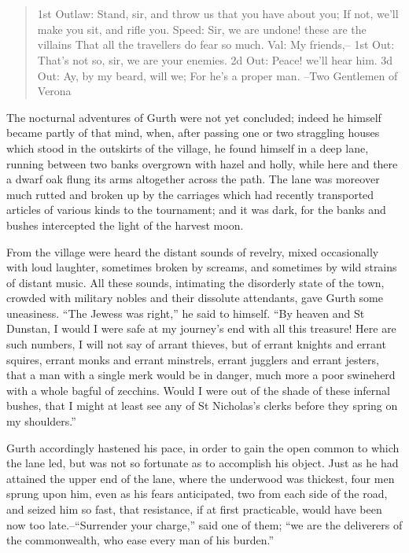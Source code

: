 \chapter{}

\begin{quote}
1st Outlaw: Stand, sir, and throw us that you have about you;
If not, we'll make you sit, and rifle you.
Speed: Sir, we are undone! these are the villains
That all the travellers do fear so much.
Val: My friends,--
1st Out: That's not so, sir, we are your enemies.
2d Out: Peace! we'll hear him.
3d Out: Ay, by my beard, will we;
For he's a proper man.
--Two Gentlemen of Verona
\end{quote}

The nocturnal adventures of Gurth were not yet concluded; indeed he
himself became partly of that mind, when, after passing one or two
straggling houses which stood in the outskirts of the village, he found
himself in a deep lane, running between two banks overgrown with hazel
and holly, while here and there a dwarf oak flung its arms altogether
across the path. The lane was moreover much rutted and broken up by the
carriages which had recently transported articles of various kinds to
the tournament; and it was dark, for the banks and bushes intercepted
the light of the harvest moon.

From the village were heard the distant sounds of revelry, mixed
occasionally with loud laughter, sometimes broken by screams, and
sometimes by wild strains of distant music. All these sounds, intimating
the disorderly state of the town, crowded with military nobles and their
dissolute attendants, gave Gurth some uneasiness. ``The Jewess was
right,'' he said to himself. ``By heaven and St Dunstan, I would I were
safe at my journey's end with all this treasure! Here are such numbers,
I will not say of arrant thieves, but of errant knights and errant
squires, errant monks and errant minstrels, errant jugglers and errant
jesters, that a man with a single merk would be in danger, much more a
poor swineherd with a whole bagful of zecchins. Would I were out of the
shade of these infernal bushes, that I might at least see any of St
Nicholas's clerks before they spring on my shoulders.''

Gurth accordingly hastened his pace, in order to gain the open common to
which the lane led, but was not so fortunate as to accomplish his
object. Just as he had attained the upper end of the lane, where the
underwood was thickest, four men sprung upon him, even as his fears
anticipated, two from each side of the road, and seized him so fast,
that resistance, if at first practicable, would have been now too
late.--``Surrender your charge,'' said one of them; ``we are the
deliverers of the commonwealth, who ease every man of his burden.''

